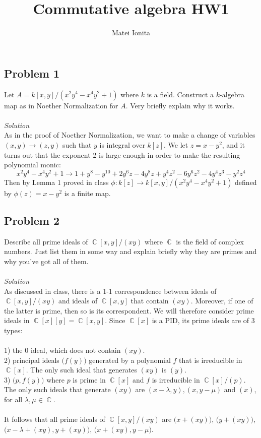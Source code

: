 \documentclass[12 pt]{article}
\title{Commutative algebra HW1}
\author{Matei Ionita}
\DeclareMathOperator {\C} {\mathbb{C}}
\begin{document}
  \maketitle

\subsection*{Problem 1}
Let $A = k[x, y]/(x^2y^4 - x^4y^2 + 1)$ where $k$ is a field. Construct a $k$-algebra map as in Noether Normalization for $A$. Very briefly explain why it works.
\\
\\
\emph{Solution}
\\
As in the proof of Noether Normalization, we want to make a change of variables $(x,y) \to (z,y)$ such that $y$ is integral over $k[z]$. We let $z = x - y^2$, and it turns out that the exponent 2 is large enough in order to make the resulting polynomial monic:
\[     x^2y^4 - x^4y^2 + 1  \to  1+y^8-y^{10}+2 y^6 z-4 y^8 z+y^4 z^2-6 y^6 z^2-4 y^4 z^3-y^2 z^4  \]
Then by Lemma 1 proved in class $\phi :k[z] \to k[x,y]/(x^2y^4 - x^4y^2 + 1)$ defined by $\phi(z) = x-y^2$ is a finite map.

\subsection*{Problem 2}
Describe all prime ideals of $\C[x, y]/(xy)$ where $\C$ is the field of complex numbers. Just list them in some way and explain briefly why they are primes and why you've got all of them.
\\
\\
\emph{Solution}
\\
As discussed in class, there is a 1-1 correspondence between ideals of $\C[x,y] / (xy)$ and ideals of $\C[x,y]$ that contain $(xy)$. Moreover, if one of the latter is prime, then so is its correspondent. We will therefore consider prime ideals in $\C[x][y] = \C[x,y]$. Since $\C[x]$ is a PID, its prime ideals are of 3 types:
\\
\\
1) the 0 ideal, which does not contain $(xy)$.
\\
2) principal ideals $\big(f(y)\big)$ generated by a polynomial $f$ that is irreducible in $\C[x]$. The only such ideal that generates $(xy)$ is $(y)$.
\\
3) $\big( p, f(y)  \big)$ where $p$ is prime in $\C[x]$ and $f$ is irreducible in $\C[x]/(p)$. The only such ideals that generate $(xy)$ are $(x-\lambda , y), (x, y-\mu)$ and $ (x)$, for all $\lambda, \mu \in \C$.
\\
\\
It follows that all prime ideals of $\C[x,y] / (xy) $ are $\big( x + (xy) \big)$, $\big( y + (xy) \big)$, $\big( x - \lambda + (xy) , y+ (xy) \big)$, $\big( x + (xy) , y- \mu \big)$.
\end{document}
